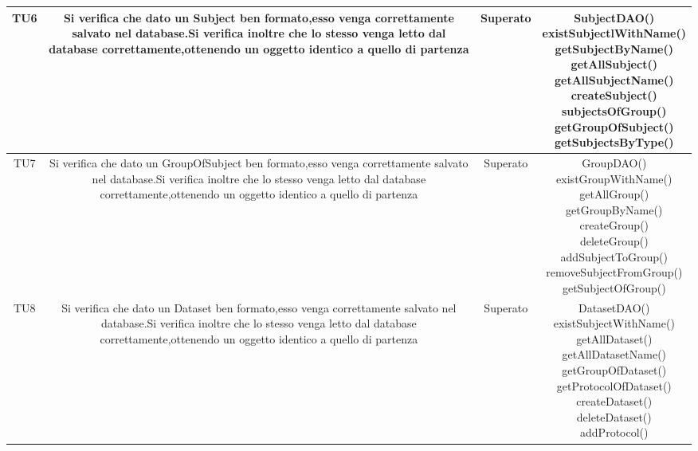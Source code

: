\begin{center}
\begin{longtable}{|c|c|c|c|}
\hline
TU6 & \parbox[t]{\larghezza}{ Si verifica che dato un Subject ben formato,esso venga correttamente salvato nel database.Si verifica inoltre che lo stesso venga letto dal database correttamente,ottenendo un oggetto identico a quello di partenza   } & Superato & \parbox[t]{\dimTipo} { SubjectDAO() \\ existSubjectlWithName() \\ getSubjectByName() \\ getAllSubject() \\ getAllSubjectName() \\ createSubject() \\ subjectsOfGroup() \\ getGroupOfSubject() \\ getSubjectsByType() \\ } \\
\hline
TU7 & \parbox[t]{\larghezza}{ Si verifica che dato un GroupOfSubject ben formato,esso venga correttamente salvato nel database.Si verifica inoltre che lo stesso venga letto dal database correttamente,ottenendo un oggetto identico a quello di partenza  } & Superato & \parbox[t]{\dimTipo} { GroupDAO() \\ existGroupWithName() \\ getAllGroup() \\ getGroupByName() \\ createGroup() \\ deleteGroup() \\ addSubjectToGroup() \\ removeSubjectFromGroup() \\ getSubjectOfGroup() \\ } \\
\hline
TU8 & \parbox[t]{\larghezza}{ Si verifica che dato un Dataset ben formato,esso venga correttamente salvato nel database.Si verifica inoltre che lo stesso venga letto dal database correttamente,ottenendo un oggetto identico a quello di partenza  } & Superato & \parbox[t]{\dimTipo} { DatasetDAO() \\ existSubjectWithName() \\ getAllDataset() \\ getAllDatasetName() \\ getGroupOfDataset() \\ getProtocolOfDataset() \\ createDataset() \\ deleteDataset() \\ addProtocol() \\ } \\

\end{longtable}
\end{center}
